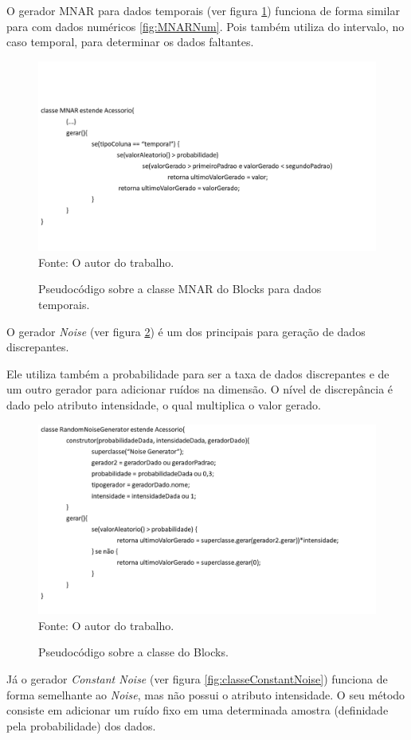 \documentclass[
	12pt,				%
	openright,			%
	oneside,			%
	a4paper,			%
	english,			%
	brazil				%
	]{abntex2}
\begin{document}
		O gerador MNAR para dados temporais (ver figura \ref{fig:MNARTemp}) funciona de forma similar para com dados numéricos \ref{fig:MNARNum}.
		Pois também utiliza do intervalo, no caso temporal, para determinar os dados faltantes.
		\begin{figure}[h!]
			\centering
			\caption{Pseudocódigo sobre a classe MNAR do Blocks para dados temporais.}
			\includegraphics[width=\linewidth]{./figures/prototipo/MNARTemp.png}
			\label{fig:MNARTemp}
			\footnotesize Fonte: O autor do trabalho.
		\end{figure}
		O gerador \emph{Noise} (ver figura \ref{fig:classeNoise}) é um dos principais para geração de dados discrepantes.
		
		Ele utiliza também a probabilidade para ser a taxa de dados discrepantes e de um outro gerador para adicionar ruídos na dimensão.
		O nível de discrepância é dado pelo atributo intensidade, o qual multiplica o valor gerado.
		\begin{figure}[h!]
			\centering
			\caption{Pseudocódigo sobre a classe do Blocks.}
			\includegraphics[width=\linewidth]{./figures/prototipo/Noise.png}
			\label{fig:classeNoise}
			\footnotesize Fonte: O autor do trabalho.
		\end{figure}
		\par
		\pagebreak
		Já o gerador \emph{Constant Noise} (ver figura \ref{fig:classeConstantNoise}) funciona de forma semelhante ao \emph{Noise}, mas não possui o atributo intensidade.
		O seu método consiste em adicionar um ruído fixo em uma determinada amostra (definidade pela probabilidade) dos dados.
\end{document}
